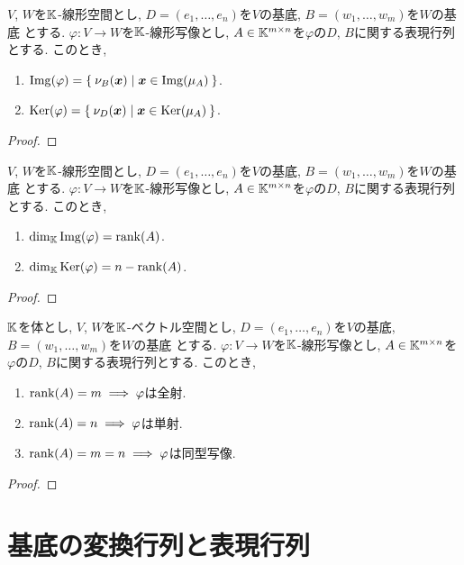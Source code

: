 \begin{prop}
  $V$, $W$を$\mathbb{K}$-線形空間とし,
  $D=(e_1,\ldots,e_n)$を$V$の基底,
  $B=(w_1,\ldots,w_m)$を$W$の基底
  とする.
  $\varphi\colon V\to W$を$\mathbb{K}$-線形写像とし,
  $A\in\mathbb{K}^{m\times n}$を$\varphi$の$D$, $B$に関する表現行列とする.
  このとき,
\begin{enumerate}
  \item $\operatorname{Img}(\varphi)=\Set{\nu_B(\boldsymbol{x}) |\boldsymbol{x}\in \operatorname{Img}(\mu_A)}$.
  \item $\operatorname{Ker}(\varphi)=\Set{\nu_D(\boldsymbol{x}) |\boldsymbol{x}\in \operatorname{Ker}(\mu_A)}$.
\end{enumerate}
\end{prop}
\begin{proof}\end{proof}

\begin{prop}
  $V$, $W$を$\mathbb{K}$-線形空間とし,
  $D=(e_1,\ldots,e_n)$を$V$の基底,
  $B=(w_1,\ldots,w_m)$を$W$の基底
  とする.
  $\varphi\colon V\to W$を$\mathbb{K}$-線形写像とし,
  $A\in\mathbb{K}^{m\times n}$を$\varphi$の$D$, $B$に関する表現行列とする.
  このとき,
\begin{enumerate}
  \item $\dim_{\mathbb{K}}\operatorname{Img}(\varphi)=\operatorname{rank}(A)$.
  \item $\dim_{\mathbb{K}}\operatorname{Ker}(\varphi)=n-\operatorname{rank}(A)$.
\end{enumerate}
\end{prop}
\begin{proof}\end{proof}

\begin{prop}
  $\mathbb{K}$を体とし,
  $V$, $W$を$\mathbb{K}$-ベクトル空間とし,
  $D=(e_1,\ldots,e_n)$を$V$の基底,
  $B=(w_1,\ldots,w_m)$を$W$の基底
  とする.
  $\varphi\colon V\to W$を$\mathbb{K}$-線形写像とし,
  $A\in\mathbb{K}^{m\times n}$を$\varphi$の$D$, $B$に関する表現行列とする.
  このとき,
\begin{enumerate}
  \item $\operatorname{rank}(A)=m\implies \varphi$は全射.
  \item $\operatorname{rank}(A)=n\implies \varphi$は単射.
  \item $\operatorname{rank}(A)=m=n\implies \varphi$は同型写像.
\end{enumerate}
\end{prop}
\begin{proof}\end{proof}

\section{基底の変換行列と表現行列}

